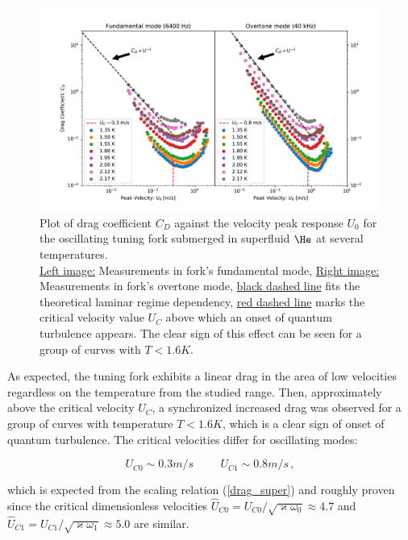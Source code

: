 \newpage

\begin{figure}[h]
	\hspace{-1.7cm}
	\includegraphics[width=1.2\textwidth]{graphics/results/fork-drag_vel}
	\caption{Plot of drag coefficient $C_D$ against the velocity peak response $U_0$ for the oscillating tuning fork submerged in superfluid $\He$ at several temperatures.\\
	\underline{Left image:} Measurements in fork's fundamental mode, \underline{Right image:} Measurements in fork's overtone mode, \underline{black dashed line} fits the theoretical laminar regime dependency, \underline{red dashed line} marks the critical velocity value $U_C$ above which an onset of quantum turbulence appears. The clear sign of this effect can be seen for a group of curves with $T < 1.6\unit{K}$.}
	\label{fork-drag_vel}
\end{figure}

As expected, the tuning fork exhibits a linear drag in the area of low velocities regardless on the temperature from the studied range. Then, approximately above the critical velocity $U_C$, a synchronized increased drag was observed for a group of curves with temperature $T < 1.6\unit{K}$, which is a clear sign of onset of quantum turbulence. The critical velocities differ for oscillating modes:

\begin{equation}
U_{C0} \sim 0.3 \unit {m/s}
\hspace{1cm}
U_{C1} \sim 0.8 \unit {m/s}\,,
\end{equation}

which is expected from the scaling relation (\ref{drag_super}) and roughly proven since the critical dimensionless velocities $\hat{U}_{C0} = U_{C0} / \sqrt{ \varkappa \omega_0} \approx 4.7$ and $\hat{U}_{C1} = U_{C1} / \sqrt{ \varkappa \omega_1} \approx 5.0$ are similar.

